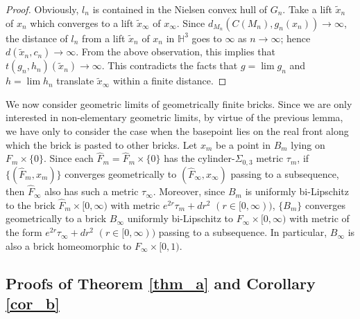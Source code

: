 \documentclass{amsart}
\theoremstyle{definition}
\numberwithin{figure}{section}
\numberwithin{equation}{section}
\newcommand{\blackboard}[1]{\ensuremath{\mathbb{#1}}}
\newcommand{\hyperbolic}{\blackboard{H}}
\def\Sg{\Sigma}
\def\Sg{\Sigma}
\begin{document}
\begin{proof}
Obviously, $l_n$ is contained in the Nielsen convex hull of $G_n$.
Take a lift $\tilde x_n$ of $x_n$ which converges to a lift $\tilde x_\infty$ of $x_\infty$.
Since $d_{M_n}(C(M_n), g_n(x_n)) \rightarrow \infty$,  the distance of $l_n$ from a lift $\tilde x_n$ of $x_n$ in $\hyperbolic^3$ goes to $\infty$ as $n\rightarrow \infty$; hence $d(\tilde x_n, c_n) \rightarrow \infty$.
From the above observation, this implies that $t(g_n, h_n)(\tilde x_n) \rightarrow \infty$.
This contradicts the facts that $g=\lim g_n$ and $h=\lim h_n$ translate $\tilde x_\infty$ within a finite distance.
\end{proof}

We now consider  geometric limits of geometrically finite bricks.
Since we are only interested in non-elementary geometric limits, by virtue of the previous lemma, we have only to consider the case when the basepoint lies on the real front along which the brick is pasted to other bricks.
Let $x_m$ be a point in $B_m$ lying on $F_m\times \{0\}$.
Since each $\hat F_m=\hat F_m\times \{0\}$ has the cylinder-$\Sg_{0,3}$ metric $\tau_m$, 
if $\{(\hat F_m,x_m)\}$ converges geometrically to $(\hat F_\infty,x_\infty)$ passing to a subsequence, then $\hat F_\infty$ also has such a metric $\tau_\infty$.
Moreover, since $B_m$ is uniformly bi-Lipschitz to the brick $\hat F_m\times [0,\infty)$ with metric $e^{2r}\tau_m +dr^2$ $(r\in [0,\infty))$, 
$\{B_m\}$ converges geometrically to a brick $B_\infty$ uniformly bi-Lipschitz to $F_\infty\times [0,\infty)$ 
with metric of the form $ e^{2r}\tau_\infty+dr^2$ $(r\in [0,\infty))$ passing to a subsequence.
In particular, $B_\infty$ is also a brick homeomorphic to $F_\infty \times [0,1)$.



\subsection{Proofs of Theorem \ref{thm_a} and Corollary \ref{cor_b}}
\end{document}
